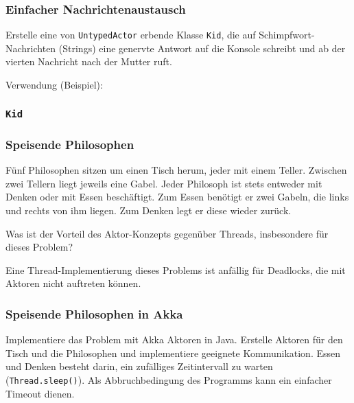 \documentclass{beamer}
\date{2017-02-06/07}
\begin{document}
\normalsize
\normalem

\lstset{language=Java}

\begin{frame}[plain]
  \titlepage
\end{frame}

\begin{frame}
  \frametitle{Einfacher Nachrichtenaustausch}
  Erstelle eine von \lstinline{UntypedActor} erbende Klasse \lstinline{Kid},
  die auf Schimpfwort-Nachrichten (Strings) eine genervte Antwort auf die Konsole schreibt
  und ab der vierten Nachricht nach der Mutter ruft.
  
  Verwendung (Beispiel):
  
\end{frame}

\begin{frame}
  \frametitle{\lstinline{Kid}}
  
\end{frame}

\begin{frame}
  \frametitle{Speisende Philosophen}
  Fünf Philosophen sitzen um einen Tisch herum,
  jeder mit einem Teller.
  Zwischen zwei Tellern liegt jeweils eine Gabel.
  Jeder Philosoph ist stets entweder mit Denken oder mit Essen beschäftigt.
  Zum Essen benötigt er zwei Gabeln, die links und rechts von ihm liegen.
  Zum Denken legt er diese wieder zurück.
  
  Was ist der Vorteil des Aktor-Konzepts gegenüber Threads,
  insbesondere für dieses Problem?
  
  \pause
  Eine Thread-Implementierung dieses Problems ist anfällig für Deadlocks,
  die mit Aktoren nicht auftreten können.
\end{frame}

\begin{frame}
  \frametitle{Speisende Philosophen in Akka}
  Implementiere das Problem mit Akka Aktoren in Java.
  Erstelle Aktoren für den Tisch und die Philosophen
  und implementiere geeignete Kommunikation.
  Essen und Denken besteht darin, ein zufälliges Zeitintervall zu warten (\lstinline{Thread.sleep()}).
  Als Abbruchbedingung des Programms kann ein einfacher Timeout dienen.
\end{frame}
\end{document}
